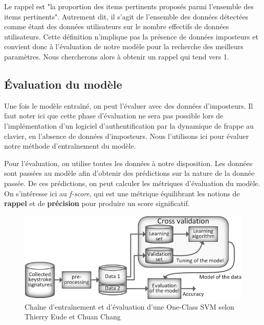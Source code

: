 Le rappel est "la proportion des items pertinents proposés parmi l'ensemble des items pertinents". Autrement dit, il s'agit de l'ensemble des données détectées comme étant des données utilisateurs sur le nombre effectifs de données utilisateurs. Cette définition n'implique pas la présence de données imposteurs et convient donc à l'évaluation de notre modèle pour la recherche des meilleurs paramètres. Nous chercherons alors à obtenir un rappel qui tend vers 1.

\subsection{Évaluation du modèle}

Une fois le modèle entraîné, on peut l'évaluer avec des données d'imposteurs. Il faut noter ici que cette phase d'évaluation ne sera pas possible lors de l'implémentation d'un logiciel d'authentification par la dynamique de frappe au clavier, en l'absence de données d'imposteurs. Nous l'utilisons ici pour évaluer notre méthode d'entraînement du modèle.

Pour l'évaluation, on utilise toutes les données à notre disposition. Les données sont passées au modèle afin d'obtenir des prédictions sur la nature de la donnée passée. De ces prédictions, on peut calculer les métriques d'évaluation du modèle. On s'intéresse ici au \textit{f-score}, qui est une métrique équilibrant les notions de \textbf{rappel} et de \textbf{précision} pour produire un score significatif.

\begin{figure}[]
    \centering
    \includegraphics[width=\linewidth]{res/ocsvm.png}
    \caption{Chaîne d'entraînement et d'évaluation d'une One-Class SVM selon Thierry Eude et Chuan Chang\cite{doi:10.1111/coin.12122}}
    \label{ocsvm}
\end{figure}
